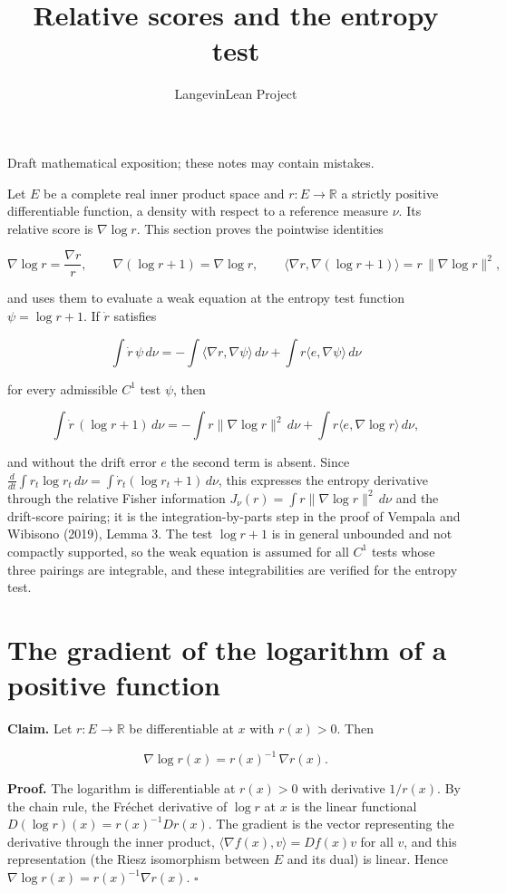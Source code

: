 \documentclass[11pt,a4paper]{article}
\title{\texorpdfstring{Relative scores and the entropy test}{Relative scores and the entropy test}}
\author{LangevinLean Project}
\date{}
\begin{document}
\maketitle
Draft mathematical exposition; these notes may contain mistakes.


Let \(E\) be a complete real inner product space and \(r:E\to\mathbb R\) a strictly positive differentiable function, a density with respect to a reference measure \(\nu\). Its relative score is \(\nabla\log r\). This section proves the pointwise identities


\[\nabla\log r=\frac{\nabla r}{r},\qquad\nabla(\log r+1)=\nabla\log r,\qquad\bigl\langle\nabla r,\nabla(\log r+1)\bigr\rangle=r\,\|\nabla\log r\|^2,\]


and uses them to evaluate a weak equation at the entropy test function \(\psi=\log r+1\). If \(\dot r\) satisfies


\[\int\dot r\,\psi\,d\nu=-\int\langle\nabla r,\nabla\psi\rangle\,d\nu+\int r\langle e,\nabla\psi\rangle\,d\nu\]


for every admissible \(C^1\) test \(\psi\), then


\[\int\dot r\,(\log r+1)\,d\nu=-\int r\|\nabla\log r\|^2\,d\nu+\int r\langle e,\nabla\log r\rangle\,d\nu,\]


and without the drift error \(e\) the second term is absent. Since \(\frac{d}{dt}\int r_t\log r_t\,d\nu=\int\dot r_t(\log r_t+1)\,d\nu\), this expresses the entropy derivative through the relative Fisher information \(J_\nu(r)=\int r\|\nabla\log r\|^2\,d\nu\) and the drift-score pairing; it is the integration-by-parts step in the proof of Vempala and Wibisono (2019), Lemma 3. The test \(\log r+1\) is in general unbounded and not compactly supported, so the weak equation is assumed for all \(C^1\) tests whose three pairings are integrable, and these integrabilities are verified for the entropy test.


\section{\texorpdfstring{The gradient of the logarithm of a positive function}{The gradient of the logarithm of a positive function}}


\textbf{Claim.} Let \(r:E\to\mathbb R\) be differentiable at \(x\) with \(r(x)>0\). Then


\[\nabla\log r(x)=r(x)^{-1}\,\nabla r(x).\]


\textbf{Proof.} The logarithm is differentiable at \(r(x)>0\) with derivative \(1/r(x)\). By the chain rule, the Fréchet derivative of \(\log r\) at \(x\) is the linear functional \(D(\log r)(x)=r(x)^{-1}Dr(x)\). The gradient is the vector representing the derivative through the inner product, \(\langle\nabla f(x),v\rangle=Df(x)v\) for all \(v\), and this representation (the Riesz isomorphism between \(E\) and its dual) is linear. Hence \(\nabla\log r(x)=r(x)^{-1}\nabla r(x)\). \(\square\)
\end{document}
